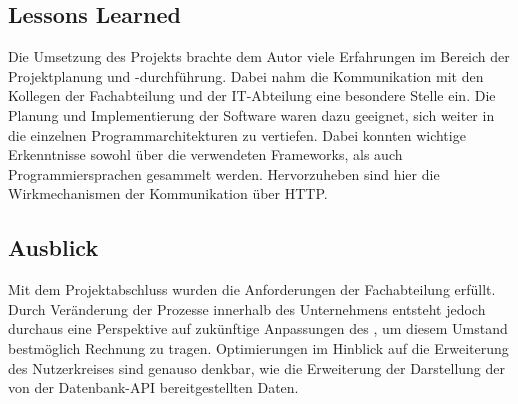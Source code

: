 \subsection{Lessons Learned}
\label{sec:LessonsLearned}
Die Umsetzung des Projekts brachte dem Autor viele Erfahrungen im Bereich der Projektplanung und -durchführung.
Dabei nahm die Kommunikation mit den Kollegen der Fachabteilung und der IT-Abteilung eine besondere Stelle ein.
Die Planung und Implementierung der Software waren dazu geeignet, sich weiter in die einzelnen Programmarchitekturen zu vertiefen.
Dabei konnten wichtige Erkenntnisse sowohl über die verwendeten Frameworks, als auch Programmiersprachen gesammelt werden.
Hervorzuheben sind hier die Wirkmechanismen der Kommunikation über \acs{HTTP}.

\subsection{Ausblick}
\label{sec:Ausblick}
Mit dem Projektabschluss wurden die Anforderungen der Fachabteilung erfüllt.
Durch Veränderung der Prozesse innerhalb des Unternehmens entsteht jedoch durchaus
eine Perspektive auf zukünftige Anpassungen des , um diesem Umstand bestmöglich
Rechnung zu tragen. Optimierungen im Hinblick auf die Erweiterung des Nutzerkreises
sind genauso denkbar, wie die Erweiterung der Darstellung der von der Datenbank-API bereitgestellten Daten.
